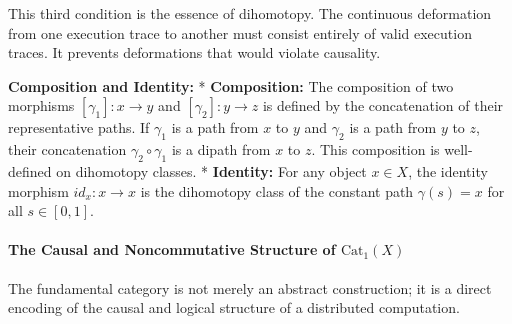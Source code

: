 \documentclass[
]{article}
\begin{document}
This third condition is the essence of dihomotopy. The continuous
deformation from one execution trace to another must consist entirely of
valid execution traces. It prevents deformations that would violate
causality.

\textbf{Composition and Identity:} * \textbf{Composition:} The
composition of two morphisms \([\gamma_1]: x \to y\) and
\([\gamma_2]: y \to z\) is defined by the concatenation of their
representative paths. If \(\gamma_1\) is a path from \(x\) to \(y\) and
\(\gamma_2\) is a path from \(y\) to \(z\), their concatenation
\(\gamma_2 \circ \gamma_1\) is a dipath from \(x\) to \(z\). This
composition is well-defined on dihomotopy classes. * \textbf{Identity:}
For any object \(x \in X\), the identity morphism \(id_x: x \to x\) is
the dihomotopy class of the constant path \(\gamma(s) = x\) for all
\(s \in [0, 1]\).

\paragraph{\texorpdfstring{The Causal and Noncommutative Structure of
\(\text{Cat}_1(X)\)}{The Causal and Noncommutative Structure of \textbackslash text\{Cat\}\_1(X)}}\label{the-causal-and-noncommutative-structure-of-textcat_1x}

The fundamental category is not merely an abstract construction; it is a
direct encoding of the causal and logical structure of a distributed
computation.
\end{document}
